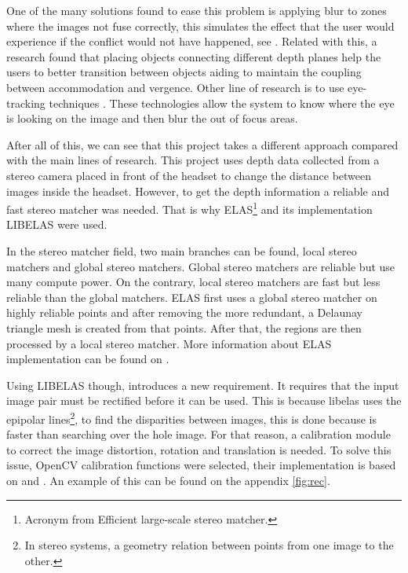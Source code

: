 \documentclass[10pt,a4paper,twocolumn,twoside]{article}
\begin{document}
	One of the many solutions found to ease this problem is applying blur to zones where the images not fuse correctly, this simulates the effect that the user would experience if the conflict would not have happened, see \cite{neareyeblur}. Related with this, a research \cite{sceneComposition} found that placing objects connecting different depth planes help the users to better transition between objects aiding to maintain the coupling between accommodation and vergence. Other line of research is to use eye-tracking techniques \cite{eyeTracking}. These technologies allow the system to know where the eye is looking on the image and then blur the out of focus areas. 
	
	After all of this, we can see that this project takes a different approach compared with the main lines of research.  This project uses depth data collected from a stereo camera placed in front of the headset to change the distance between images inside the headset. However, to get the depth information a reliable and fast stereo matcher was needed. That is why ELAS\footnote{Acronym from Efficient large-scale stereo matcher.} \cite{LIBELAS} and its implementation LIBELAS were used.
		
	In the stereo matcher field, two main branches can be found, local stereo matchers and global stereo matchers. Global stereo matchers are reliable but use many compute power. On the contrary, local stereo matchers are fast but less reliable than the global matchers. ELAS first uses a global stereo matcher on highly reliable points and after removing the more redundant, a Delaunay triangle mesh is created from that points. After that, the regions are then processed by a local stereo matcher. More information about ELAS implementation can be found on \cite{LIBELAS}. 
	
	Using LIBELAS though, introduces a new requirement. It requires that the input image pair must be rectified before it can be used. This is because libelas uses the epipolar lines\footnote{In stereo systems, a geometry relation between points from one image to the other. }, to find the disparities between images, this is done because is faster than searching over the hole image. For that reason, a calibration module to correct the image distortion, rotation and translation is needed. To solve this issue, OpenCV calibration functions were selected, their implementation is based on \cite{bouguetcalibration} and \cite{calibrationopencv2}. An example of this can be found on the appendix \ref{fig:rec}.
\end{document}
